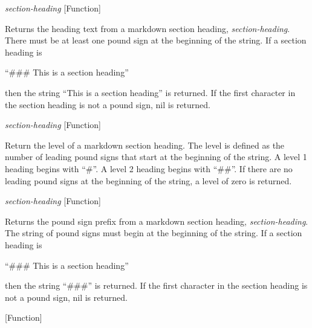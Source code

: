 \vspace{1em}
\noindent
{}
\usebox{\funcname}\emph{section-heading}
 \hfill [Function]

\begin{doc-string}
Returns the heading text from a markdown section heading, \emph{section-heading}.
There must be at least one pound sign at the beginning of the string.  If a
section heading is

   ``\#\#\# This is a section heading''

then the string ``This is a section heading'' is returned.  If the first
character in the section heading is not a pound sign, nil is returned.
\end{doc-string}

\vspace{1em}
\noindent
{}
\usebox{\funcname}\emph{section-heading}
 \hfill [Function]

\begin{doc-string}
Return the level of a markdown section heading.  The level is defined as
the number of leading pound signs that start at the beginning of the string.
A level 1 heading begins with ``\#''.  A level 2 heading begins with ``\#\#''.
If there are no leading pound signs at the beginning of the string, a level of
zero is returned.
\end{doc-string}

\vspace{1em}
\noindent
{}
\usebox{\funcname}\emph{section-heading}
 \hfill [Function]

\begin{doc-string}
Returns the pound sign prefix from a markdown section heading,
\emph{section-heading}.  The string of pound signs must begin at the beginning of the
string.  If a section heading is

   ``\#\#\# This is a section heading''

then the string ``\#\#\#'' is returned.  If the first character in the section
heading is not a pound sign, nil is returned.
\end{doc-string}

\vspace{1em}
\noindent
{}
\usebox{\funcname}
 \hfill [Function]

